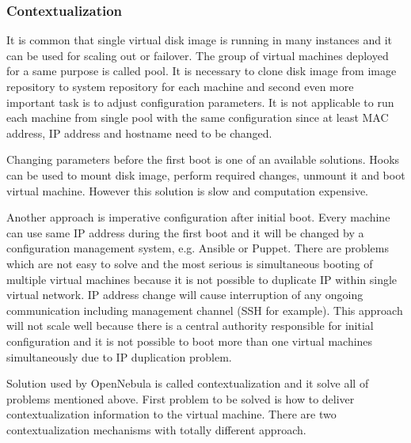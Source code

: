 \subsubsection{Contextualization}
It is common that single virtual disk image is running in many instances and it can be used for scaling out or failover. The group of virtual machines deployed for a same purpose is called pool. It is necessary to clone disk image from image repository to system repository for each machine and second even more important task is to adjust configuration parameters. It is not applicable to run each machine from single pool with the same configuration since at least \Ac{MAC} address, \Ac{IP} address and hostname need to be changed.

Changing parameters before the first boot is one of an available solutions. Hooks can be used to mount disk image, perform required changes, unmount it and boot virtual machine. However this solution is slow and computation expensive.

Another approach is imperative configuration after initial boot. Every machine can use same \Ac{IP} address during the first boot and it will be changed by a configuration management system, e.g. Ansible or Puppet. There are problems which are not easy to solve and the most serious is simultaneous booting of multiple virtual machines because it is not possible to duplicate \Ac{IP} within single virtual network. \Ac{IP} address change will cause interruption of any ongoing communication including management channel (\Ac{SSH} for example). This approach will not scale well because there is a central authority responsible for initial configuration and it is not possible to boot more than one virtual machines simultaneously due to \Ac{IP} duplication problem.

Solution used by OpenNebula is called contextualization and it solve all of problems mentioned above. First problem to be solved is how to deliver contextualization information to the virtual machine. There are two contextualization mechanisms with totally different approach.

